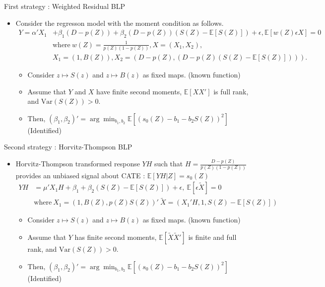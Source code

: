 \documentclass[xcolor=svgnames,aspectratio=169]{beamer}
\newcommand{\E}{\mathbb{E}}
\newcommand{\var}{\text{Var}}
\begin{document}
\begin{frame}{First strategy : Weighted Residual BLP}
    \begin{itemize}
        \item Consider the regresson model with the moment condition as follows.
        \begin{align*}
            Y=\alpha'X_1&+\beta_1(D-p(Z))+\beta_2(D-p(Z))(S(Z)-\E[S(Z)])+\epsilon, \E[w(Z)\epsilon X]=0 \\
            &\text{where} \  w(Z)=\frac{1}{p(Z)(1-p(Z))}, X=(X_1,X_2), \\ 
            &X_1=(1,B(Z)),X_2=(D-p(Z),(D-p(Z)(S(Z)-\E[S(Z)]))).
        \end{align*}
        \begin{tcolorbox}[colframe=Cyan,title=Theorem 1]
        \begin{itemize}
            \item Consider $z\mapsto S(z)$ and $z\mapsto B(z)$ as fixed maps. (known function)
            \item Assume that $Y$ and $X$ have finite second moments, $\E[XX']$ is full rank, and $\var(S(Z))>0$.
            \item Then, $(\beta_1, \beta_2)'=\arg\min_{b_1,b_2}\E[(s_0(Z)-b_1-b_2 S(Z))^2]$ (Identified)
        \end{itemize}
    \end{tcolorbox}
    \end{itemize}
\end{frame}

\begin{frame}{Second strategy : Horvitz-Thompson BLP}
    \begin{itemize}
        \item Horvitz-Thompson transformed response $YH$ such that $H=\frac{D-p(Z)}{p(Z)(1-p(Z))}$ provides an unbiased signal about CATE : $\E[YH|Z]=s_0(Z)$
        \begin{align*}
            YH&=\mu'X_1H+\beta_1+\beta_2(S(Z)-\E[S(Z)])+\epsilon, \ \E[\epsilon\tilde{X}]=0 \\
            &\text{where} \ X_1=(1,B(Z),p(Z)S(Z))' \  \tilde{X}=(X_1'H, 1, S(Z)-\E[S(Z)])
        \end{align*}
        \begin{tcolorbox}[colframe=Cyan,title=Theorem 2]
        \begin{itemize}
            \item Consider $z\mapsto S(z)$ and $z\mapsto B(z)$ as fixed maps. (known function)
            \item Assume that $Y$ has finite second moments, $\E[\tilde{X}\tilde{X}']$ is finite and full rank, and $\var(S(Z))>0$.
            \item Then, $(\beta_1, \beta_2)'=\arg\min_{b_1,b_2}\E[(s_0(Z)-b_1-b_2 S(Z))^2]$ (Identified)
        \end{itemize}
    \end{tcolorbox}
    \end{itemize}
\end{frame}
\end{document}
